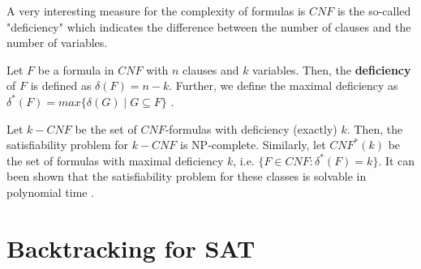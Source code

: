 \documentclass[12pt]{book}
\begin{document}
A very interesting measure for the complexity of formulas is $CNF$ is the so-called "deficiency" which indicates the difference 
between the number of clauses and the number of variables.
\begin{defi}\label{def:df1}
      Let $F$ be a formula in $CNF$ with $n$ clauses and $k$ variables. Then, the \textbf{deficiency} of $F$ is defined as $\delta (F) = n - k$. 
	  Further, we define the maximal deficiency as $\delta ^*(F) = max \{ \delta (G) \mid G \subseteq F \}$ \cite{h6}.
\end{defi} 
Let $k-CNF$ be the set of $CNF$-formulas with deficiency (exactly) $k$. Then, the satisfiability problem for $k-CNF$ is NP-complete. 
Similarly, let $CNF ^* (k)$ be the set of formulas with maximal deficiency $k$, i.e. 
$\{F \in CNF : \delta ^*(F) = k \}$. It can been shown that the satisfiability problem for these classes is solvable in polynomial time \cite{h6}.

\section{Backtracking for SAT}
\label{sec:Backtracking for SAT}
\end{document}
